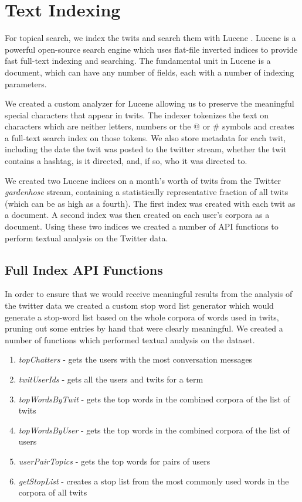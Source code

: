 \section{Text Indexing}

For topical search, we index the twits and search them with Lucene \cite{code:lucene}.
Lucene is a powerful open-source search engine which uses flat-file inverted indices to provide fast full-text indexing and searching.  The fundamental unit in Lucene is a document, which can have any number of fields, each with a number of indexing parameters.

We created a custom analyzer for Lucene allowing us to preserve the meaningful special characters that appear in twits.  The indexer tokenizes the text on characters which are neither letters, numbers or the @ or \# symbols and creates a full-text search index on those tokens.  We also store metadata for each twit, including the date the twit was posted to the twitter stream, whether the twit contains a hashtag, is it directed, and, if so, who it was directed to.

We created two Lucene indices on a month's worth of twits from the Twitter \emph{gardenhose} stream, containing a statistically representative fraction of all twits (which can be as high as a fourth).  The first index was created with each twit as a document.  A second index was then created on each user's corpora as a document.  Using these two indices we created a number of API functions to perform textual analysis on the Twitter data.

\subsection{Full Index API Functions}

In order to ensure that we would receive meaningful results from the analysis of the twitter data we created a custom stop word list generator which would generate a stop-word list based on the whole corpora of words used in twits, pruning out some entries by hand that were clearly meaningful.  We created a number of functions which performed textual analysis on the dataset.

\begin{enumerate}
\item \emph{topChatters} - gets the users with the most conversation messages
\item \emph{twitUserIds} - gets all the users and twits for a term
\item \emph{topWordsByTwit} - gets the top words in the combined corpora of the list of twits
\item \emph{topWordsByUser} - gets the top words in the combined corpora of the list of users
\item \emph{userPairTopics} - gets the top words for pairs of users
\item \emph{getStopList} - creates a stop list from the most commonly used words in the corpora of all twits
\end{enumerate}


